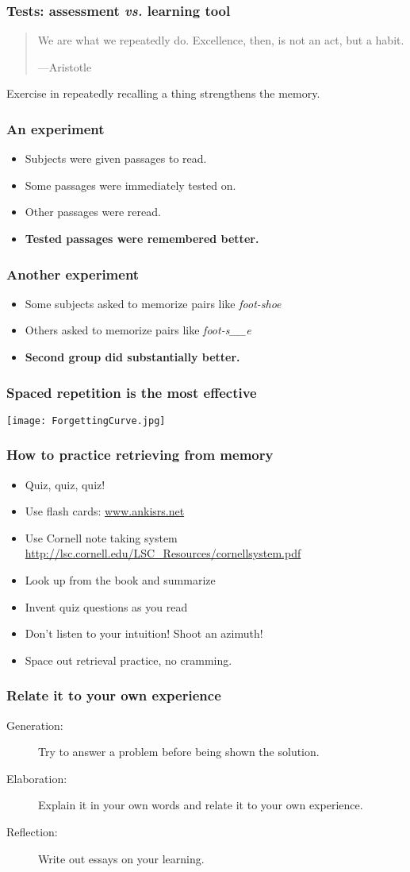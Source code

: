 \documentclass{beamer}
\newcommand{\bi}{\begin{itemize}}
\newcommand{\li}{\item}
\newcommand{\ei}{\end{itemize}}
\newcommand{\bfr}[1]{\begin{frame}[fragile]\frametitle{{ #1 }}}
\begin{document}
\bfr{Tests: assessment {\em vs.} learning tool}


\begin{quotation}
We are what we repeatedly do. Excellence, then, is not an act, but a habit.

\hfill ---Aristotle
\end{quotation}

\vfill


 Exercise in repeatedly recalling a thing strengthens the memory.

\vfill
\end{frame}

\bfr{An experiment}
\bi
\li Subjects were given passages to read.
\li Some passages were immediately tested on.
\li Other passages were reread.
\li {\bf Tested passages were remembered better.}
\ei
\end{frame}

\bfr{Another experiment}
\bi
\li Some subjects asked to memorize pairs like {\em foot-shoe}
\li Others asked to memorize pairs like {\em foot-s\_\_e}
\li {\bf Second group did substantially better.}
\ei
\end{frame}
\bfr{}
\centerline{\huge{}}
\end{frame}

\bfr{Spaced repetition is the most effective}
\begin{center}
\texttt{[image: ForgettingCurve.jpg]}
\end{center}
\end{frame}


\bfr{How to practice retrieving from memory}
\bi
\li Quiz, quiz, quiz!
\li Use flash cards: \url{www.ankisrs.net}
\li Use Cornell note taking system \\\url{http://lsc.cornell.edu/LSC_Resources/cornellsystem.pdf}
\li Look up from the book and summarize
\li Invent quiz questions as you read
\ei
\bi
\li Don't listen to your intuition!  Shoot an azimuth!
\li Space out retrieval practice, no cramming.
\ei
\end{frame}

\bfr{Relate it to your own experience}

\begin{description}
\item[Generation:]
  Try to answer a problem before being shown the solution.
\item[Elaboration:]
  Explain it in your own words and relate it to your own experience.
\item[Reflection:] Write out essays on your learning.
\end{description}
\end{frame}
\end{document}
